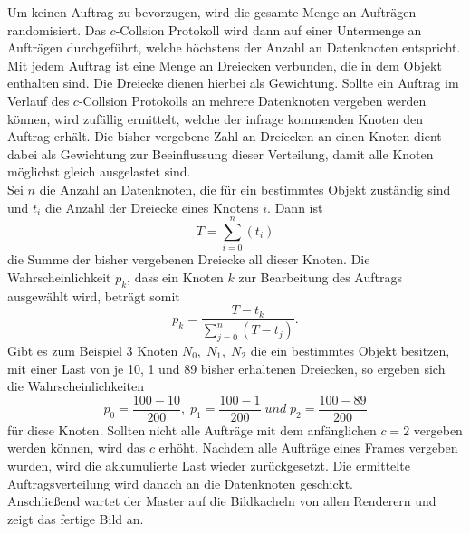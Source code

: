 Um keinen Auftrag zu bevorzugen, wird die gesamte Menge an Aufträgen randomisiert. Das $c$-Collsion Protokoll wird dann auf einer Untermenge an Aufträgen durchgeführt, welche höchstens der Anzahl an Datenknoten entspricht. Mit jedem Auftrag ist eine Menge an Dreiecken verbunden, die in dem Objekt enthalten sind. Die Dreiecke dienen hierbei als Gewichtung. Sollte ein Auftrag im Verlauf des $c$-Collsion Protokolls an mehrere Datenknoten vergeben werden können, wird zufällig ermittelt, welche der infrage kommenden Knoten den Auftrag erhält. Die bisher vergebene Zahl an Dreiecken an einen Knoten dient dabei als Gewichtung zur Beeinflussung dieser Verteilung, damit alle Knoten möglichst gleich ausgelastet sind.\\
Sei $n$ die Anzahl an Datenknoten, die für ein bestimmtes Objekt zuständig sind und $t_i$ die Anzahl der Dreiecke eines Knotens $i$. Dann ist
\[T=\sum_{i=0}^{n} \left(t_i\right)\]
die Summe der bisher vergebenen Dreiecke all dieser Knoten. Die Wahrscheinlichkeit $p_k$, dass ein Knoten $k$ zur Bearbeitung des Auftrags ausgewählt wird, beträgt somit 
  \[p_k=\frac{T-t_k}{\sum_{j=0}^{n} \left(T-t_j\right)}.\]
Gibt es zum Beispiel 3 Knoten $N_0,\; N_1,\; N_2$ die ein bestimmtes Objekt besitzen, mit einer Last von je 10, 1 und 89 bisher erhaltenen Dreiecken, so ergeben sich die Wahrscheinlichkeiten
\[p_0=\frac{100-10}{200}, \;p_1=\frac{100-1}{200}\; und \;p_2=\frac{100-89}{200}\]
für diese Knoten. Sollten nicht alle Aufträge mit dem anfänglichen $c=2$ vergeben werden können, wird das $c$ erhöht. Nachdem alle Aufträge eines Frames vergeben wurden, wird die akkumulierte Last wieder zurückgesetzt. Die ermittelte Auftragsverteilung wird danach an die Datenknoten geschickt.\\
Anschließend wartet der Master auf die Bildkacheln von allen Renderern und zeigt das fertige Bild an.


